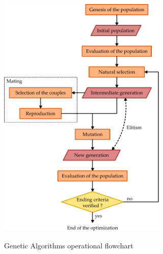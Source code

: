 \documentclass{ametsoc}
\begin{document}
\begin{figure}[t]
	\begin{center}
		\noindent\includegraphics[width=19pc,angle=0]{figures/figure_structure_gas.pdf}\\
	\end{center}
	\caption{Genetic Algorithms operational flowchart}
	\label{fig:structure_gas}
\end{figure}
\end{document}
